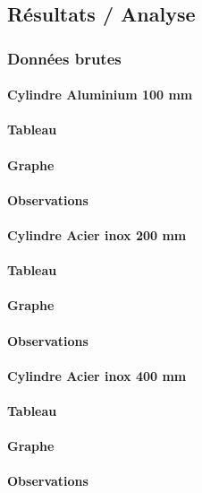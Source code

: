 \newpage

\subsection{\large Résultats / Analyse}
\subsubsection{\large Données brutes}
\paragraph{\large Cylindre Aluminium 100 mm}
\paragraph{Tableau}
\paragraph{Graphe}
\paragraph{Observations}

\paragraph{\large Cylindre Acier inox 200 mm}
\paragraph{Tableau}
\paragraph{Graphe}
\paragraph{Observations}

\paragraph{\large Cylindre Acier inox 400 mm}
\paragraph{Tableau}
\paragraph{Graphe}
\paragraph{Observations}

